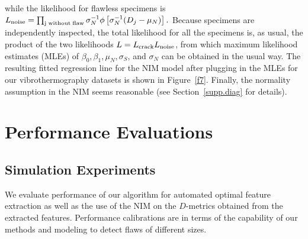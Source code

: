 \documentclass[12pt]{article}
\begin{document}
while the likelihood for flawless specimens is  
$L_{{\rm noise}} =\prod _{{\rm j\; without\; flaw}}{\sigma^{-1}_{N} }  \phi 
\left[\sigma_N^{-1}({D_{j} -\mu _{N} }) \right].$ 
Because specimens are independently inspected, the total likelihood
for all the specimens is, as usual, the product of the two likelihoods
$L=L_{{\rm crack}} L_{{\rm noise}}$, from which maximum likelihood
estimates (MLEs) of $\beta _{0} ,\beta _{1} ,\mu _{N} ,\sigma _{S} $, 
and $\sigma _{N} $ can be obtained in the usual way. The resulting  
fitted regression line for the NIM model after plugging in the MLEs
for our vibrothermography datasets  is shown in
Figure~\ref{f7}. Finally, the normality assumption in the NIM seems
reasonable (see Section~\ref{supp.diag} for details).

\section{Performance Evaluations}
\label{evaluations}
\subsection{Simulation Experiments}
We evaluate performance of our algorithm for 
automated optimal feature extraction as well as the use of the NIM on
the $D$-metrics obtained from the extracted features. Performance 
calibrations are in terms of the capability of our methods
and modeling to detect flaws of different sizes. 
\end{document}
